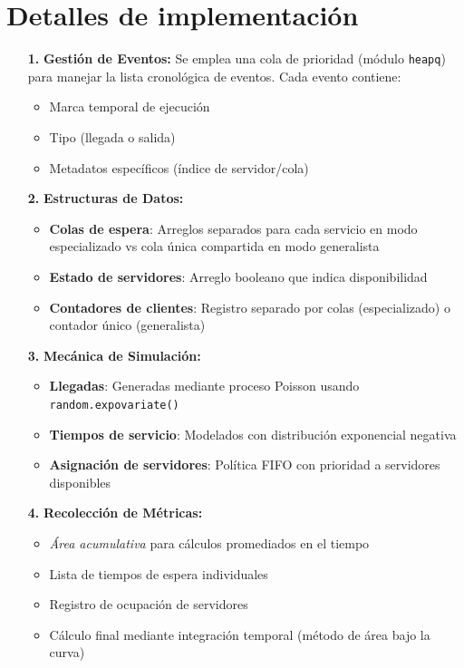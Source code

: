 \documentclass[letterpaper, 12pt]{report}
\begin{document}
\section{Detalles de implementación}


\begin{itemize}
    \item[\textbf{1.}] \textbf{Gestión de Eventos:}
    Se emplea una cola de prioridad (módulo \texttt{heapq}) para manejar la lista cronológica de eventos. Cada evento contiene:
    \begin{itemize}
        \item Marca temporal de ejecución
        \item Tipo (llegada o salida)
        \item Metadatos específicos (índice de servidor/cola)
    \end{itemize}
    
    \item[\textbf{2.}] \textbf{Estructuras de Datos:}
    \begin{itemize}
        \item \textbf{Colas de espera}: Arreglos separados para cada servicio en modo especializado vs cola única compartida en modo generalista
        \item \textbf{Estado de servidores}: Arreglo booleano que indica disponibilidad
        \item \textbf{Contadores de clientes}: Registro separado por colas (especializado) o contador único (generalista)
    \end{itemize}
    
    \item[\textbf{3.}] \textbf{Mecánica de Simulación:}
    \begin{itemize}
        \item \textbf{Llegadas}: Generadas mediante proceso Poisson usando \texttt{random.expovariate()}
        \item \textbf{Tiempos de servicio}: Modelados con distribución exponencial negativa
        \item \textbf{Asignación de servidores}: Política FIFO con prioridad a servidores disponibles
    \end{itemize}
    
    \item[\textbf{4.}] \textbf{Recolección de Métricas:}
    \begin{itemize}
        \item \textit{Área acumulativa} para cálculos promediados en el tiempo
        \item Lista de tiempos de espera individuales
        \item Registro de ocupación de servidores
        \item Cálculo final mediante integración temporal (método de área bajo la curva)
    \end{itemize}
\end{itemize}
\end{document}
